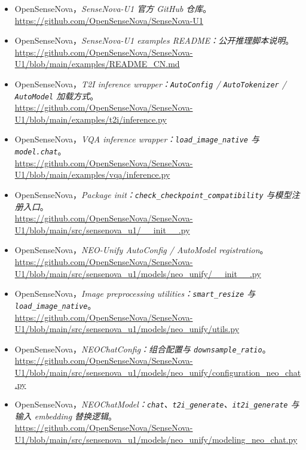 \begingroup
\small
\sloppy
\begin{itemize}[leftmargin=1.5em]
  \item OpenSenseNova，\emph{SenseNova-U1 官方 GitHub 仓库}。\\
  \url{https://github.com/OpenSenseNova/SenseNova-U1}
  \item OpenSenseNova，\emph{SenseNova-U1 examples README：公开推理脚本说明}。\\
  \url{https://github.com/OpenSenseNova/SenseNova-U1/blob/main/examples/README_CN.md}
  \item OpenSenseNova，\emph{T2I inference wrapper：\texttt{AutoConfig} / \texttt{AutoTokenizer} / \texttt{AutoModel} 加载方式}。\\
  \url{https://github.com/OpenSenseNova/SenseNova-U1/blob/main/examples/t2i/inference.py}
  \item OpenSenseNova，\emph{VQA inference wrapper：\texttt{load\_image\_native} 与 \texttt{model.chat}}。\\
  \url{https://github.com/OpenSenseNova/SenseNova-U1/blob/main/examples/vqa/inference.py}
  \item OpenSenseNova，\emph{Package init：\texttt{check\_checkpoint\_compatibility} 与模型注册入口}。\\
  \url{https://github.com/OpenSenseNova/SenseNova-U1/blob/main/src/sensenova_u1/__init__.py}
  \item OpenSenseNova，\emph{NEO-Unify AutoConfig / AutoModel registration}。\\
  \url{https://github.com/OpenSenseNova/SenseNova-U1/blob/main/src/sensenova_u1/models/neo_unify/__init__.py}
  \item OpenSenseNova，\emph{Image preprocessing utilities：\texttt{smart\_resize} 与 \texttt{load\_image\_native}}。\\
  \url{https://github.com/OpenSenseNova/SenseNova-U1/blob/main/src/sensenova_u1/models/neo_unify/utils.py}
  \item OpenSenseNova，\emph{NEOChatConfig：组合配置与 \texttt{downsample\_ratio}}。\\
  \url{https://github.com/OpenSenseNova/SenseNova-U1/blob/main/src/sensenova_u1/models/neo_unify/configuration_neo_chat.py}
  \item OpenSenseNova，\emph{NEOChatModel：\texttt{chat}、\texttt{t2i\_generate}、\texttt{it2i\_generate} 与输入 embedding 替换逻辑}。\\
  \url{https://github.com/OpenSenseNova/SenseNova-U1/blob/main/src/sensenova_u1/models/neo_unify/modeling_neo_chat.py}

\end{itemize}
